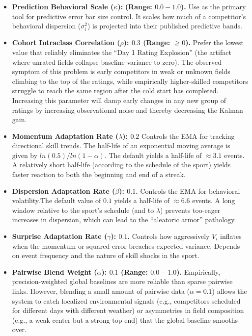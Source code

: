 \documentclass[12pt]{article}
\begin{document}
	\begin{itemize}
		\item \textbf{Prediction Behavioral Scale ($\kappa$):} \textbf{(Range: $0.0 - 1.0$).} Use as the primary tool for predictive error bar size control. It scales how much of a competitor's behavioral dispersion ($\sigma_i^2$) is projected into their published predictive bands.
		\item \textbf{Cohort Intraclass Correlation ($\rho$): $0.3$ (Range: $\ge 0$).}
		Prefer the lowest value that reliably eliminates the ``Day 1 Rating Explosion'' (the artifact where unrated fields collapse baseline variance to zero). The observed symptom of this problem is early competitors in weak or unknown fields climbing to the top of the ratings, while empirically higher-skilled competitors struggle to reach the same region after the cold start has completed. Increasing this parameter will damp early changes in any new group of ratings by increasing observational noise and thereby decreasing the Kalman gain.
		\item \textbf{Momentum Adaptation Rate ($\lambda$): $0.2$}
		Controls the EMA for tracking directional skill trends. The half-life of an exponential moving average is given by $ln(0.5) / ln(1 - \alpha)$.
		The default yields a half-life of $\approx 3.1$ events. A relatively short half-life (according to the schedule of the sport) yields faster reaction to both the beginning and end of a streak.
		\item \textbf{Dispersion Adaptation Rate ($\beta$): $0.1$.}
		Controls the EMA for behavioral volatility.The default value of $0.1$ yields a half-life of $\approx 6.6$ events. A long window relative to the sport's schedule (and to $\lambda$) prevents too-eager increases in dispersion, which can lead to the ``aleatoric armor'' pathology.
		\item \textbf{Surprise Adaptation Rate ($\gamma$): $0.1$.}
		Controls how aggressively $V_i$ inflates when the momentum or squared error breaches expected variance. Depends on event frequency and the nature of skill shocks in the sport.
		\item \textbf{Pairwise Blend Weight ($\alpha$): $0.1$ (Range: $0.0 - 1.0$).}
		Empirically, precision-weighted global baselines are more reliable than sparse pairwise links. However, blending a small amount of pairwise data ($\alpha=0.1$) allows the system to catch localized environmental signals (e.g., competitors scheduled for different days with different weather) or asymmetries in field composition (e.g., a weak center but a strong top end) that the global baseline smooths over.

\end{itemize}
\end{document}
